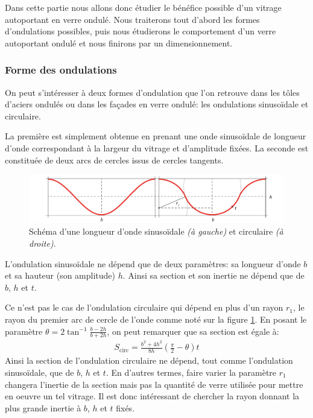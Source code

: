 \documentclass[11pt,titlepage]{article}
\begin{document}
Dans cette partie nous allons donc étudier le bénéfice possible d'un vitrage autoportant en verre ondulé. Nous traiterons tout d'abord les formes d'ondulations possibles, puis nous étudierons le comportement d'un verre autoportant ondulé et nous finirons par un dimensionnement.

\subsubsection{Forme des ondulations}
On peut s'intéresser à deux formes d'ondulation que l'on retrouve dans les tôles d'aciers ondulés ou dans les façades en verre ondulé: les ondulations sinusoïdale et circulaire. 

La première est simplement obtenue en prenant une onde sinusoïdale de longueur d'onde correspondant à la largeur du vitrage et d'amplitude fixées. La seconde est constituée de deux arcs de cercles issus de cercles tangents.

\begin{figure}[H]
    \centering
    \includegraphics[width=\linewidth]{img/ondul/circ.pdf}
    \caption{Schéma d'une longueur d'onde sinusoïdale \textit{(à gauche)} et circulaire \textit{(à droite)}.}
    \label{fig:ondcirc}
\end{figure}

L'ondulation sinusoïdale ne dépend que de deux paramètres: sa longueur d'onde $b$ et sa hauteur (son amplitude) $h$. Ainsi sa section et son inertie ne dépend que de $b$, $h$ et $t$.

Ce n'est pas le cas de l'ondulation circulaire qui dépend en plus d'un rayon $r_1$, le rayon du premier arc de cercle de l'onde comme noté sur la figure \ref{fig:ondcirc}. En posant le paramètre $\theta = 2 \tan^{-1} \frac{b-2h}{b+2h}$, on peut remarquer que sa section est égale à:
\begin{align}
    S_{\text{circ}} = \frac{b^2+4h^2}{8h} \left ( \frac{\pi}{2} - \theta\right )t
\end{align}
Ainsi la section de l'ondulation circulaire ne dépend, tout comme l'ondulation sinusoïdale, que de $b$, $h$ et $t$. En d'autres termes, faire varier la paramètre $r_1$ changera l'inertie de la section mais pas la quantité de verre utilisée pour mettre en oeuvre un tel vitrage.  Il est donc intéressant de chercher la rayon donnant la plus grande inertie à $b$, $h$ et $t$ fixés.
\end{document}
